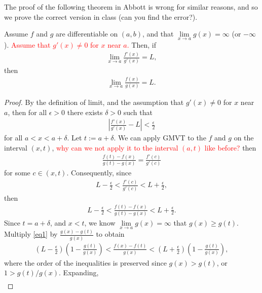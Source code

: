 \documentclass{ximera}
\begin{document}
The proof of the following theorem in Abbott is wrong for similar reasons, and so we prove the correct version in class (can you find the error?).
\begin{theorem}
    Assume $f$ and $g$ are differentiable on $(a,b)$, and that $\lim\limits_{x\to a} g(x) = \infty$ (or $-\infty$).  \textcolor{red}{Assume that $g'(x) \neq 0$ for $x$ near $a$.}  Then, if
    \begin{align*}
        \lim\limits_{x\to a} \frac{f'(x)}{g'(x)} = L,
    \end{align*}
    then 
    \begin{align*}
        \lim\limits_{x\to a} \frac{f(x)}{g(x)} = L.
    \end{align*}
\end{theorem}
\begin{proof}
    By the definition of limit, and the assumption that $g'(x) \neq 0$ for $x$ near $a$, then for all $\epsilon > 0$ there exists $\delta > 0$ such that
    \begin{align*}
        \left| \frac{f'(x)}{g'(x)} - 
        L\right| < \frac{\epsilon}2
    \end{align*}
    for all $a < x< a+\delta$.  Let $t := a+\delta $.   We can apply GMVT to the $f$ and $g$ on the interval $(x,t)$, \textcolor{red}{why can we not apply it to the interval $(a,t)$ like before?} then
    \begin{align*} 
        \frac{f(t) - f(x)}{g(t) - g(x)} = \frac{f'(c)}{g'(c)}
    \end{align*}
    for some $c \in (x,t)$.  Consequently, since 
    \begin{align*}
    L- \frac{\epsilon}2 < \frac{f'(c)}{g'(c)} < L + \frac{\epsilon}2,
    \end{align*}
    then 
    \begin{align} \label{eq1}
    L- \frac{\epsilon}2 < \frac{f(t) - f(x)}{g(t) - g(x)} < L + \frac{\epsilon}2.
    \end{align}
    Since $t = a+\delta$, and $x < t$, we know $\lim\limits_{x\to a} g(x) = \infty$ that $g(x) \geq g(t)$.  Multiply \eqref{eq1} by $\frac{g(x) - g(t)}{g(x)}$ to obtain
    \begin{align*}
        \left(L - \frac{\epsilon}2 \right)\left(1 - \frac{g(t)}{g(x)}\right) < \frac{f(x) - f(t)}{g(x)} < \left(L + \frac{\epsilon}2 \right)\left(1 - \frac{g(t)}{g(x)}\right),
    \end{align*}
    where the order of the inequalities is preserved since $g(x) > g(t)$, or $1 > g(t)/g(x)$. Expanding,
    \begin{align*}

\end{align*}
\end{proof}
\end{document}
